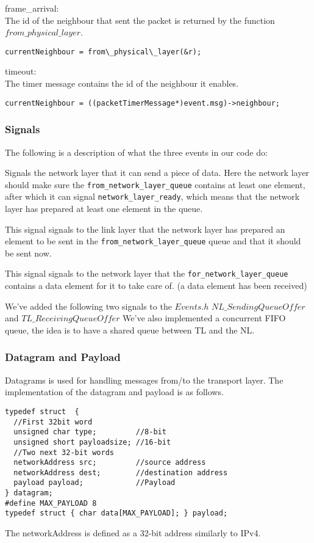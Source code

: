 frame\_arrival:\\
The id of the neighbour that sent the packet is returned by the function $from\_physical\_layer$.
\begin{lstlisting}
currentNeighbour = from\_physical\_layer(&r);
\end{lstlisting}

timeout:\\
The timer message contains the id of the neighbour it enables.
\begin{lstlisting}
currentNeighbour = ((packetTimerMessage*)event.msg)->neighbour;
\end{lstlisting}
\subsubsection{Signals}
The following is a description of what the three events in our code do:
\begin{description}[leftmargin=1em, style=nextline]
\item [\texttt{network\_layer\_allowed\_to\_send}] Signals the network layer that it can send a piece of data.
Here the network layer should make sure the \texttt{from\_network\_layer\_queue}
contains at least one element, after which it can signal \texttt{network\_layer\_ready},
which means that the network layer has prepared at least one element in the queue.

\item [\texttt{network\_layer\_ready}] This signal signals to the link layer that the network layer has prepared an element to be sent in the
 \texttt{from\_network\_layer\_queue} queue and that it should be sent now.

\item [\texttt{data\_for\_network\_layer}]
This signal signals to the network layer that the
\texttt{for\_network\_layer\_queue} contains a data element for it to take care of. (a data element has been received)
\end{description}


We've added the following two signals to the $Events.h$
$NL\_SendingQueueOffer$
and
\break
$TL\_ReceivingQueueOffer$
We've also implemented a concurrent FIFO queue, the idea is to have a shared queue between TL and the NL.

\subsubsection{Datagram and Payload}
Datagrams is used for handling messages from/to the transport layer.
The implementation of the datagram and payload is as follows.
\begin{lstlisting}
typedef struct  {
  //First 32bit word
  unsigned char type;         //8-bit
  unsigned short payloadsize; //16-bit
  //Two next 32-bit words
  networkAddress src;         //source address
  networkAddress dest;        //destination address
  payload payload;            //Payload
} datagram;
#define MAX_PAYLOAD 8
typedef struct { char data[MAX_PAYLOAD]; } payload;
\end{lstlisting}
The networkAddress is defined as a 32-bit address similarly to IPv4.

